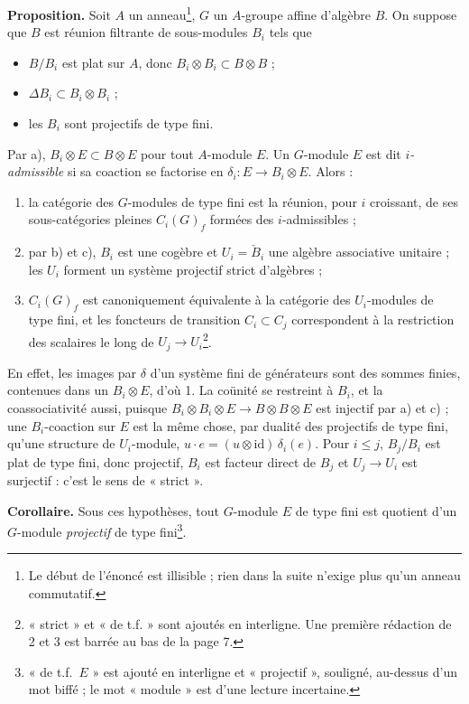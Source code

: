 \documentclass[11pt,a4paper]{article}
\begin{document}
\textbf{Proposition.} Soit $A$ un anneau\footnote{Le début de l'énoncé est
illisible ; rien dans la suite n'exige plus qu'un anneau commutatif.}, $G$
un $A$-groupe affine d'algèbre $B$. On suppose que $B$ est réunion
filtrante de sous-modules $B_i$ tels que
\begin{itemize}
  \item[a)] $B/B_i$ est plat sur $A$, donc $B_i \otimes B_i \subset B
    \otimes B$ ;
  \item[b)] $\Delta B_i \subset B_i \otimes B_i$ ;
  \item[c)] les $B_i$ sont projectifs de type fini.
\end{itemize}
Par a), $B_i \otimes E \subset B \otimes E$ pour tout $A$-module $E$. Un
$G$-module $E$ est dit \emph{$i$-admissible} si sa coaction se factorise
en $\delta_i \colon E \to B_i \otimes E$. Alors :
\begin{enumerate}
  \item la catégorie des $G$-modules de type fini est la réunion, pour $i$
    croissant, de ses sous-catégories pleines $C_i(G)_f$ formées des
    $i$-admissibles ;
  \item par b) et c), $B_i$ est une cogèbre et $U_i = \check{B}_i$ une
    algèbre associative unitaire ; les $U_i$ forment un système projectif
    strict d'algèbres ;
  \item $C_i(G)_f$ est canoniquement équivalente à la catégorie des
    $U_i$-modules de type fini, et les foncteurs de transition $C_i \subset
    C_j$ correspondent à la restriction des scalaires le long de $U_j \to
    U_i$\footnote{« strict » et « de t.f. » sont ajoutés en interligne. Une
    première rédaction de 2 et 3 est barrée au bas de la page 7.}.
\end{enumerate}

En effet, les images par $\delta$ d'un système fini de
générateurs sont des sommes finies, contenues dans un $B_i \otimes E$, d'où
1. La coünité se restreint à $B_i$, et la coassociativité aussi, puisque
$B_i \otimes B_i \otimes E \to B \otimes B \otimes E$ est injectif par a)
et c) ; une $B_i$-coaction sur $E$ est la même chose, par dualité des
projectifs de type fini, qu'une structure de $U_i$-module, $u \cdot e = (u
\otimes \mathrm{id})\,\delta_i(e)$. Pour $i \leq j$, $B_j/B_i$ est plat de
type fini, donc projectif, $B_i$ est facteur direct de $B_j$ et $U_j \to
U_i$ est surjectif : c'est le sens de « strict ».

\textbf{Corollaire.} Sous ces hypothèses, tout $G$-module $E$ de type fini
est quotient d'un $G$-module \emph{projectif} de type fini\footnote{« de
t.f.\ $E$ » est ajouté en interligne et « projectif », souligné, au-dessus
d'un mot biffé ; le mot « module » est d'une lecture incertaine.}.
\end{document}
